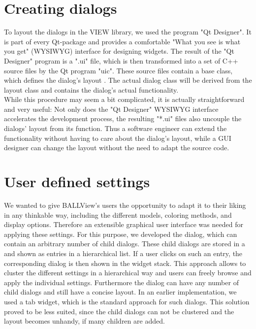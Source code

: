 \section{Creating dialogs}
\label{designer}
To layout the dialogs in the VIEW library, we used the program "Qt Designer".
It is part of every Qt-package and provides a comfortable "What you see is what you get"
(WYSIWYG) interface for designing widgets.
The result of the "Qt Designer" program is a ".ui" file, which is then transformed 
into a set of C++ source files by the Qt program "uic".
These source files contain a base class, which defines the dialog's layout . 
The actual dialog class will be derived from the layout class and contains the dialog's
actual functionality.
\\
While this procedure may seem a bit complicated, it is actually straightforward and 
very useful:
Not only does the "Qt Designer" WYSIWYG interface accelerates the development process, 
the resulting "*.ui" files also uncouple the dialogs' layout from its function. 
Thus a software engineer can extend the functionality without 
having to care about the dialog's layout, while a GUI designer can change the layout
without the need to adapt the source code.

\section{User defined settings}
\label{preferences}
We wanted to give BALLView's users the opportunity to adapt it to their liking in any
thinkable way, including the different models, coloring methods, and display options. 
Therefore an extensible graphical user interface was needed for applying these settings. 
For this purpose, we developed the  dialog, which can contain an 
arbitrary number of child dialogs. 
These child dialogs are stored in a  and shown as entries in 
a hierarchical list. 
If a user clicks on such an entry, the corresponding dialog is then shown in the 
widget stack.
This approach allows to cluster the different settings in a hierarchical way
and users can freely browse and apply the individual settings.
Furthermore the  dialog can have any number of child dialogs and still 
have a concise layout.
In an earlier implementation, we used a tab widget, which is the standard approach for
such dialogs. This solution proved to be less suited, since the child dialogs can not
be clustered and the layout becomes unhandy, if many children are added.

